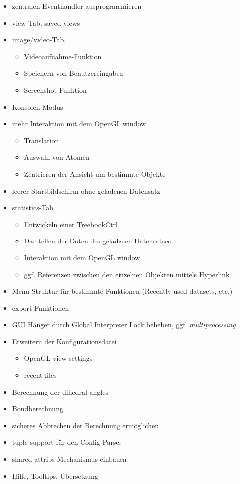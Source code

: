 \thispagestyle{empty}
\begin{itemize}
\item zentralen Eventhandler ausprogrammieren
\item view-Tab, saved views
\item image/video-Tab,
\begin{itemize}
	\item Videoaufnahme-Funktion
	\item Speichern von Benutzereingaben
	\item Screenshot Funktion
\end{itemize}
\item Konsolen Modus
\item mehr Interaktion mit dem OpenGL window
\begin{itemize}
	\item Translation
	\item Auswahl von Atomen
	\item Zentrieren der Ansicht um bestimmte Objekte
\end{itemize}
\item leerer Startbildschirm ohne geladenen Datensatz
\item statistics-Tab
\begin{itemize}
	\item Entwickeln einer TreebookCtrl
	\item Darstellen der Daten des geladenen Datensatzes
	\item Interaktion mit dem OpenGL window
	\item ggf. Referenzen zwischen den einzelnen Objekten mittels Hyperlink
\end{itemize}
\item Menu-Struktur für bestimmte Funktionen (Recently used datasets, etc.)
\item export-Funktionen
\item GUI Hänger durch Global Interpreter Lock beheben, ggf. \textit{multiprocessing}
\item Erweitern der Konfigurationsdatei
\begin{itemize}
	\item OpenGL view-settings
	\item recent files
\end{itemize}
\item Berechnung der dihedral angles
\item Bondberechnung
\item sicheres Abbrechen der Berechnung ermöglichen
\item tuple support für den Config-Parser
\item shared attribs Mechanismus einbauen
\item Hilfe, Tooltips, Übersetzung
\end{itemize}
\clearpage

